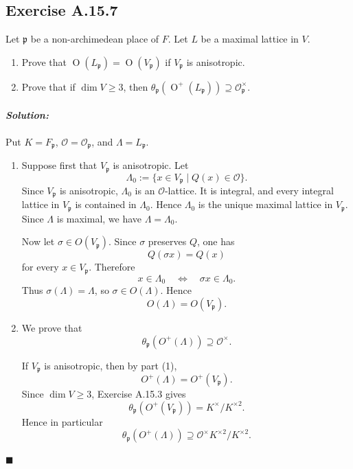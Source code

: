 \documentclass[12pt, a4paper]{article}
\newenvironment{solution}
  {\paragraph{\textit{Solution:}}\par\medskip}
  {\hfill$\blacksquare$\vspace{0.1cm}}
\begin{document}
\subsection*{Exercise A.15.7}
Let $\mathfrak{p}$ be a non-archimedean place of $F$. Let $L$ be a maximal lattice in $V$.
\begin{enumerate}
    \item Prove that $\operatorname{O}(L_{\mathfrak{p}}) = \operatorname{O}(V_{\mathfrak{p}})$ if $V_{\mathfrak{p}}$ is anisotropic.
    \item Prove that if $\dim V \ge 3$, then $\theta_{\mathfrak{p}}(\operatorname{O}^+(L_{\mathfrak{p}})) \supseteq \mathcal{O}_{\mathfrak{p}}^\times$.
\end{enumerate}
\begin{solution}
Put \(K=F_{\mathfrak p}\), \(\mathcal O=\mathcal O_{\mathfrak p}\), and
\(\Lambda=L_{\mathfrak p}\).

\begin{enumerate}
    \item Suppose first that \(V_{\mathfrak p}\) is anisotropic. Let
    \[
    \Lambda_0:=\{x\in V_{\mathfrak p}\mid Q(x)\in \mathcal O\}.
    \]
    Since \(V_{\mathfrak p}\) is anisotropic, \(\Lambda_0\) is an
    \(\mathcal O\)-lattice. It is integral, and every integral lattice in
    \(V_{\mathfrak p}\) is contained in \(\Lambda_0\). Hence \(\Lambda_0\) is
    the unique maximal lattice in \(V_{\mathfrak p}\). Since \(\Lambda\) is
    maximal, we have \(\Lambda=\Lambda_0\).

    Now let \(\sigma\in O(V_{\mathfrak p})\). Since \(\sigma\) preserves \(Q\),
    one has
    \[
    Q(\sigma x)=Q(x)
    \]
    for every \(x\in V_{\mathfrak p}\). Therefore
    \[
    x\in \Lambda_0
    \quad\Longleftrightarrow\quad
    \sigma x\in \Lambda_0.
    \]
    Thus \(\sigma(\Lambda)=\Lambda\), so \(\sigma\in O(\Lambda)\). Hence
    \[
    O(\Lambda)=O(V_{\mathfrak p}).
    \]

    \item We prove that
    \[
    \theta_{\mathfrak p}(O^+(\Lambda))\supseteq \mathcal O^\times.
    \]

    If \(V_{\mathfrak p}\) is anisotropic, then by part (1),
    \[
    O^+(\Lambda)=O^+(V_{\mathfrak p}).
    \]
    Since \(\dim V\ge 3\), Exercise A.15.3 gives
    \[
    \theta_{\mathfrak p}(O^+(V_{\mathfrak p}))
    =
    K^\times/K^{\times 2}.
    \]
    Hence in particular
    \[
    \theta_{\mathfrak p}(O^+(\Lambda))
    \supseteq \mathcal O^\times K^{\times 2}/K^{\times 2}.
    \]


\end{enumerate}
\end{solution}
\end{document}
